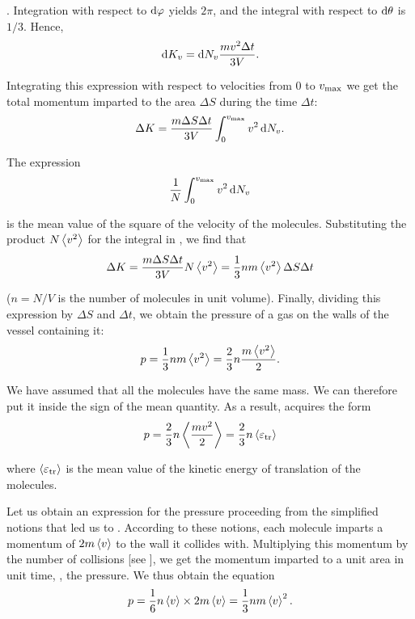 . Integration with respect to $\mathrm{d}\varphi$ yields $2\pi$, and the integral with respect to $\mathrm{d}\theta$ is $1/3$. Hence,
\begin{equation*}
	\mathrm{d} K_v = \mathrm{d} N_v \frac{mv^2\Delta t}{3V}.
\end{equation*}

\noindent
Integrating this expression with respect to velocities from $0$ to $v_{\text{max}}$ we get the total momentum imparted to the area $\Delta S$ during the time $\Delta t$:
\begin{equation}\label{eq:11_26}
	\Delta K = \frac{m\Delta S\Delta t}{3V} \int_{0}^{v_{\text{max}}} v^2\,\mathrm{d} N_v.
\end{equation}

The expression
\begin{equation*}
	\frac{1}{N}\int_{0}^{v_{\text{max}}} v^2\,\mathrm{d} N_v
\end{equation*}

\noindent
is the mean value of the square of the velocity of the molecules. Substituting the product $N\left\langle v^2 \right\rangle$ for the integral in , we find that
\begin{equation*}
	\Delta K = \frac{m\Delta S\Delta t}{3V} N \left\langle v^2 \right\rangle = \frac{1}{3} nm \left\langle v^2 \right\rangle \Delta S\Delta t
\end{equation*}

\noindent
($n=N/V$ is the number of molecules in unit volume). Finally, dividing this expression by $\Delta S$ and $\Delta t$, we obtain the pressure of a gas on the walls of the vessel containing it:
\begin{equation}\label{eq:11_27}
	p = \frac{1}{3} nm \left\langle v^2 \right\rangle = \frac{2}{3} n \frac{m\left\langle v^2 \right\rangle}{2}.
\end{equation}

We have assumed that all the molecules have the same mass. We can therefore put it inside the sign of the mean quantity. As a result,  acquires the form
\begin{equation}\label{eq:11_28}
	p = \frac{2}{3} n \left\langle \frac{mv^2}{2} \right\rangle = \frac{2}{3}n\left\langle \varepsilon_{\text{tr}} \right\rangle
\end{equation}

\noindent
where $\left\langle \varepsilon_{\text{tr}} \right\rangle$ is the mean value of the kinetic energy of translation of the molecules.

Let us obtain an expression for the pressure proceeding from the simplified notions that led us to . According to these notions, each molecule imparts a momentum of $2m\left\langle v \right\rangle$ to the wall it collides with. Multiplying this momentum by the number of collisions [see ], we get the momentum imparted to a unit area in unit time, \ie, the pressure. We thus obtain the equation
\begin{equation}\label{eq:11_29}
	p = \frac{1}{6} n \left\langle v \right\rangle \times 2m\left\langle v \right\rangle = \frac{1}{3}nm\left\langle v \right\rangle^2.
\end{equation}

